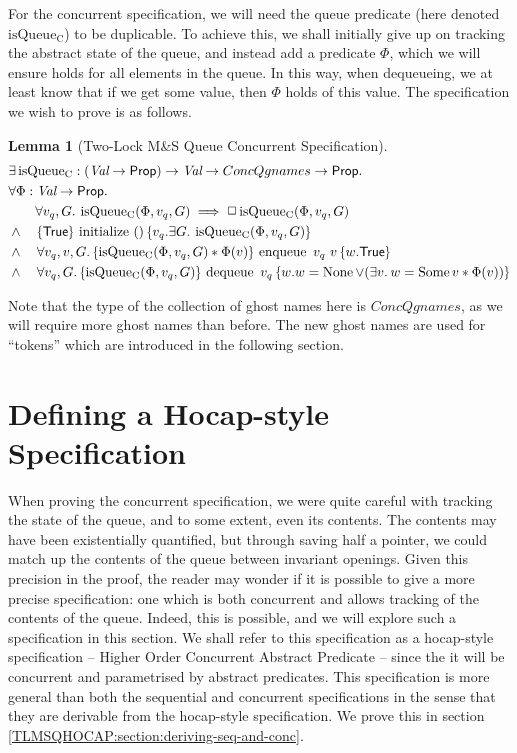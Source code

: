 \documentclass[a4paper, 10pt]{report}
\theoremstyle{definition}
\newtheorem{lemma}[theorem]{Lemma}
\newcommand{\initialise}{\operatorname{initialize}}
\newcommand{\enqueue}{\operatorname{enqueue}}
\newcommand{\dequeue}{\operatorname{dequeue}}
\newcommand{\msq}{M\&S Queue}
\newcommand{\tlmsq}{Two-Lock \msq{}}
\newcommand{\isqueueconc}{\operatorname{isQueue_{C}}}
\newcommand{\ConcQgnames}{ConcQgnames}
\newcommand{\vq}{v_q}
\newcommand{\nodeval}{\valB}
\newcommand{\absvalue}{\val}
\newcommand{\Qg}{G}
\newcommand{\tlconcspecinitHTGen}[3]{\hoare{\TRUE}{\initialise \ \TT}{#2 . \Exists #3. \isqueueconc(#1, #2, #3)}}
\newcommand{\tlconcspecinitGen}[3]{\tlconcspecinitHTGen{#1}{#2}{#3}}
\newcommand{\tlconcspecinit}[1]{\tlconcspecinitGen{#1}{\vq}{\Qg}}
\newcommand{\tlconcspecenqHT}[4]{\hoare{\isqueueconc(#1, #2, #4) \star{} #1(#3)}{\enqueue \ #2 \ #3}{\valB . \TRUE}}
\newcommand{\tlconcspecenqGen}[4]{\All #2, #3, #4. \tlconcspecenqHT{#1}{#2}{#3}{#4}}
\newcommand{\tlconcspecenq}[1]{\tlconcspecenqGen{#1}{\vq}{\absvalue}{\Qg}}
\newcommand{\tlconcspecdeqHT}[3]{\hoare{\isqueueconc(#1, #2, #3)}{\dequeue \ #2}{\nodeval . \nodeval = \None \lor{} (\Exists \absvalue . \nodeval = \Some \absvalue \star{} #1(\absvalue))}}
\newcommand{\tlconcspecdeqGen}[3]{\All #2, #3. \tlconcspecdeqHT{#1}{#2}{#3}}
\newcommand{\tlconcspecdeq}[1]{\tlconcspecdeqGen{#1}{\vq}{\Qg}}
\begin{document}
For the concurrent specification, we will need the queue predicate (here denoted $\isqueueconc$) to be duplicable. To achieve this, we shall initially give up on tracking the abstract state of the queue, and instead add a predicate $\Phi$, which we will ensure holds for all elements in the queue. In this way, when dequeueing, we at least know that if we get some value, then $\Phi$ holds of this value. The specification we wish to prove is as follows.
\begin{lemma}[\tlmsq{} Concurrent Specification]\label{TLMSQ:spec:conc}
\begin{align*}
  &\Exists \isqueueconc : (\Val \to \Prop) \to \Val \to \ConcQgnames \to \Prop.\\
  &\All \Phi : \Val \to \Prop.\\
  &\quad\quad \All \vq, \Qg . \isqueueconc(\Phi, \vq, \Qg) \implies \persistently \isqueueconc(\Phi, \vq, \Qg)\\
  &\land{}\quad\tlconcspecinit{\Phi}\\
  &\land{}\quad\tlconcspecenq{\Phi}\\
  &\land{}\quad\tlconcspecdeq{\Phi}
\end{align*}
\end{lemma}
Note that the type of the collection of ghost names here is $\ConcQgnames$, as we will require more ghost names than before. The new ghost names are used for ``tokens'' which are introduced in the following section.


\section{Defining a Hocap-style Specification}
\label{QueueSpecs:section:hocap}

When proving the concurrent specification, we were quite careful with tracking the state of the queue, and to some extent, even its contents. The contents may have been existentially quantified, but through saving half a pointer, we could match up the contents of the queue between invariant openings. Given this precision in the proof, the reader may wonder if it is possible to give a more precise specification: one which is both concurrent and allows tracking of the contents of the queue. Indeed, this is possible, and we will explore such a specification in this section. We shall refer to this specification as a hocap-style specification -- Higher Order Concurrent Abstract Predicate -- since the it will be concurrent and parametrised by abstract predicates. This specification is more general than both the sequential and concurrent specifications in the sense that they are derivable from the hocap-style specification. We prove this in section \ref{TLMSQHOCAP:section:deriving-seq-and-conc}.
\end{document}
